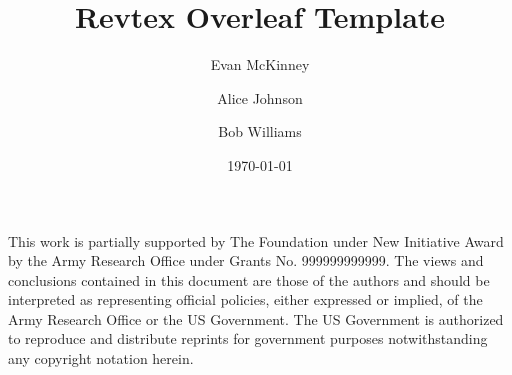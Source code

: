 \documentclass[%
 reprint,
superscriptaddress,
amsmath,amssymb,
aps,
pra,
]{revtex4-2}
\begin{document}

\title{Revtex Overleaf Template}

\author{Evan McKinney}

\author{Alice Johnson}

\author{Bob Williams}

\date{\today}



\maketitle



\begin{acknowledgments}
This work is partially supported by The Foundation under New Initiative Award by the Army Research Office under Grants No. 999999999999. The views and conclusions contained in this document are those of the authors and should be interpreted as representing official policies, either expressed or implied, of the Army Research Office or the US Government. The US Government is authorized to reproduce and distribute reprints for government purposes notwithstanding any copyright notation herein.
\end{acknowledgments}

\nocite{*}

\end{document}
